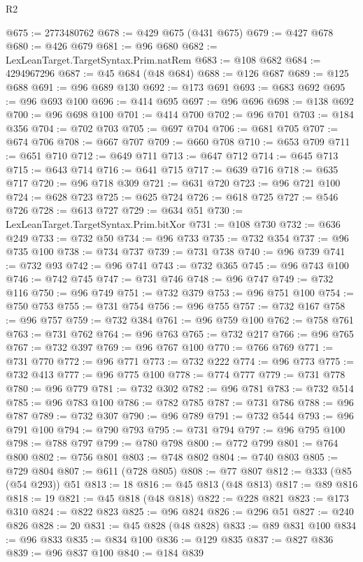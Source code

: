 \begin{lexlean}{R2}
\begin{coremodule}
@675 := 2773480762
@678 := @429 @675 (@431 @675)
@679 := @427 @678
@680 := @426 @679
@681 := @96 @680
@682 := LexLeanTarget.TargetSyntax.Prim.natRem
@683 := @108 @682
@684 := 4294967296
@687 := @45 @684 (@48 @684)
@688 := @126 @687
@689 := @125 @688
@691 := @96 @689 @130
@692 := @173 @691
@693 := @683 @692
@695 := @96 @693 @100
@696 := @414 @695
@697 := @96 @696
@698 := @138 @692
@700 := @96 @698 @100
@701 := @414 @700
@702 := @96 @701
@703 := @184 @356
@704 := @702 @703
@705 := @697 @704
@706 := @681 @705
@707 := @674 @706
@708 := @667 @707
@709 := @660 @708
@710 := @653 @709
@711 := @651 @710
@712 := @649 @711
@713 := @647 @712
@714 := @645 @713
@715 := @643 @714
@716 := @641 @715
@717 := @639 @716
@718 := @635 @717
@720 := @96 @718 @309
@721 := @631 @720
@723 := @96 @721 @100
@724 := @628 @723
@725 := @625 @724
@726 := @618 @725
@727 := @546 @726
@728 := @613 @727
@729 := @634 @51
@730 := LexLeanTarget.TargetSyntax.Prim.bitXor
@731 := @108 @730
@732 := @636 @249
@733 := @732 @50
@734 := @96 @733
@735 := @732 @354
@737 := @96 @735 @100
@738 := @734 @737
@739 := @731 @738
@740 := @96 @739
@741 := @732 @93
@742 := @96 @741
@743 := @732 @365
@745 := @96 @743 @100
@746 := @742 @745
@747 := @731 @746
@748 := @96 @747
@749 := @732 @116
@750 := @96 @749
@751 := @732 @379
@753 := @96 @751 @100
@754 := @750 @753
@755 := @731 @754
@756 := @96 @755
@757 := @732 @167
@758 := @96 @757
@759 := @732 @384
@761 := @96 @759 @100
@762 := @758 @761
@763 := @731 @762
@764 := @96 @763
@765 := @732 @217
@766 := @96 @765
@767 := @732 @397
@769 := @96 @767 @100
@770 := @766 @769
@771 := @731 @770
@772 := @96 @771
@773 := @732 @222
@774 := @96 @773
@775 := @732 @413
@777 := @96 @775 @100
@778 := @774 @777
@779 := @731 @778
@780 := @96 @779
@781 := @732 @302
@782 := @96 @781
@783 := @732 @514
@785 := @96 @783 @100
@786 := @782 @785
@787 := @731 @786
@788 := @96 @787
@789 := @732 @307
@790 := @96 @789
@791 := @732 @544
@793 := @96 @791 @100
@794 := @790 @793
@795 := @731 @794
@797 := @96 @795 @100
@798 := @788 @797
@799 := @780 @798
@800 := @772 @799
@801 := @764 @800
@802 := @756 @801
@803 := @748 @802
@804 := @740 @803
@805 := @729 @804
@807 := @611 (@728 @805)
@808 := @77 @807
@812 := @333 (@85 (@54 @293)) @51
@813 := 18
@816 := @45 @813 (@48 @813)
@817 := @89 @816
@818 := 19
@821 := @45 @818 (@48 @818)
@822 := @228 @821
@823 := @173 @310
@824 := @822 @823
@825 := @96 @824
@826 := @296 @51
@827 := @240 @826
@828 := 20
@831 := @45 @828 (@48 @828)
@833 := @89 @831 @100
@834 := @96 @833
@835 := @834 @100
@836 := @129 @835
@837 := @827 @836
@839 := @96 @837 @100
@840 := @184 @839

\end{coremodule}
\end{lexlean}
